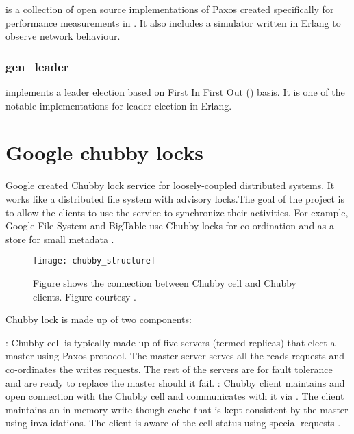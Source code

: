 \citet{Lugano2012} is a collection of open source
implementations of Paxos created specifically for performance measurements
in \citet{MarandiPSP10}. It also includes a simulator written in Erlang to
observe network behaviour.

\subsubsection{gen\_leader}

\citet{Ulf2012} implements a leader election based on First In
First Out () basis. It is one of the notable implementations for
leader election in Erlang.

\section{Google chubby locks}
\label{section:chubby.locks}

Google created Chubby lock service \citep{Burrows06} for loosely-coupled
distributed systems. It works like a distributed file system with advisory
locks.The goal of the project is to allow the clients to use the service
to synchronize their activities. For example, Google File System \citep{gfs}
and BigTable \citep{ChangDGHWBCFG06} use Chubby locks for co-ordination and
as a store for small metadata \citep{ChandraGR07}.

\begin{figure}
  \texttt{[image: chubby\_structure]}
  \caption[Chubby structure]{%
    Figure shows the connection between Chubby cell and Chubby clients.
    Figure courtesy \citet{Burrows06}.}
  \label{figure:chubby.structure}
\end{figure}

Chubby lock is made up of two components:

\begin{itemize}
    : Chubby cell is typically made up of five servers
    (termed replicas) that elect a master using Paxos protocol. The master
    server serves all the reads requests and co-ordinates the writes requests.
    The rest of the servers are for fault tolerance and are ready to replace the
    master should it fail.
    : Chubby client maintains and open connection with
    the Chubby cell and communicates with it via %
    . The client maintains an in-memory write though cache that
    is kept consistent by the master using invalidations. The client is
    aware of the cell status using special requests%
    .
\end{itemize}

